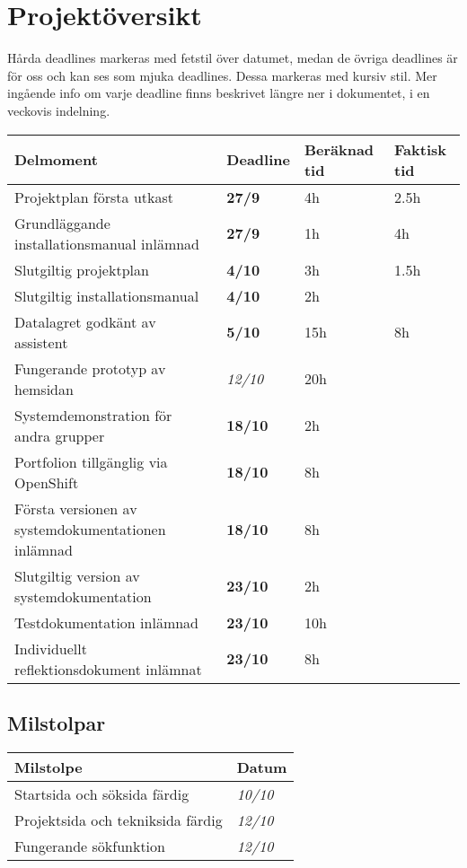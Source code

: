 \documentclass{TDP003mall}
\begin{document}
\section{Projektöversikt}
Hårda deadlines markeras med fetstil över datumet, medan de övriga deadlines är för oss och kan ses som mjuka deadlines. Dessa markeras med kursiv stil.
Mer ingående info om varje deadline finns beskrivet längre ner i dokumentet, i en veckovis indelning.
\begin{table}[!h]
\begin{tabularx}{\linewidth}{|l|R|R|R|}
\hline
\textbf{Delmoment} & \textbf{Deadline} & \textbf{Beräknad tid} & \textbf{Faktisk tid} \\\hline \hline
Projektplan första utkast & \textbf{27/9} & 4h & 2.5h\\\hline
Grundläggande installationsmanual inlämnad & \textbf{27/9} & 1h & 4h\\\hline \hline
Slutgiltig projektplan & \textbf{4/10} & 3h & 1.5h\\\hline
Slutgiltig installationsmanual & \textbf{4/10} & 2h &\\\hline
Datalagret godkänt av assistent& \textbf{5/10} & 15h & 8h\\\hline \hline
Fungerande prototyp av hemsidan & \textit{12/10} & 20h &\\\hline \hline
Systemdemonstration för andra grupper & \textbf{18/10} & 2h &\\\hline
Portfolion tillgänglig via OpenShift & \textbf{18/10} & 8h &\\\hline
Första versionen av systemdokumentationen inlämnad & \textbf{18/10} & 8h &\\\hline \hline
Slutgiltig version av systemdokumentation & \textbf{23/10} & 2h &\\\hline
Testdokumentation inlämnad & \textbf{23/10} & 10h &\\\hline
Individuellt reflektionsdokument inlämnat & \textbf{23/10} & 8h &\\\hline
\end{tabularx}
\end{table}

\subsection{Milstolpar}

\begin{table}[!h]

\begin{tabularx}{\linewidth}{|l|R|}
\hline
\textbf{Milstolpe} & \textbf{Datum} \\\hline \hline
Startsida och söksida färdig & \textit{10/10}\\\hline
Projektsida och tekniksida färdig & \textit{12/10}\\\hline
Fungerande sökfunktion & \textit{12/10}\\\hline
\end{tabularx}
\end{table}
\end{document}

